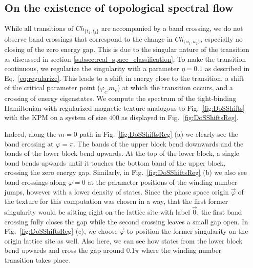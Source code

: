 \documentclass[submission, Phys]{SciPost}
\begin{document}
\subsection{On the existence of topological spectral flow}
While all transitions of $Ch_{\lbrace t_1, t_2 \rbrace }$ are accompanied by a band crossing, we do not observe band crossings that correspond to the change in $Ch_{\lbrace u_1, u_2 \rbrace }$, especially no closing of the zero energy gap. This is due to the singular nature of the transition as discussed in section \ref{subsec:real_space_classification}. To make the transition continuous, we regularize the singularity with a parameter $\eta=0.1$ as described in Eq.~\eqref{eq:regularize}. This leads to a shift in energy close to the transition, a shift of the critical parameter point ($\varphi_c$,$m_c$) at which the transition occurs, and a crossing of energy eigenstates.
We compute the spectrum of the tight-binding Hamiltonian with regularized magnetic texture analogous to Fig.~\ref{fig:DoSShifts} with the KPM on a system of size $400$ as displayed in Fig.~\ref{fig:DoSShiftsReg}.

Indeed, along the $m=0$ path in Fig.~\ref{fig:DoSShiftsReg} (a) we clearly see the band crossing at $\varphi=\pi$. The bands of the upper block bend downwards and the bands of the lower block bend upwards. At the top of the lower block, a single band bends upwards until it touches the bottom band of the upper block, crossing the zero energy gap.
Similarly, in Fig.~\ref{fig:DoSShiftsReg} (b) we also see band crossings along $\varphi=0$ at the parameter positions of the winding number jumps, however with a lower density of states. Since the phase space origin $\vec{\varphi}$ of the texture for this computation was chosen in a way, that the first former singularity would be sitting right on the lattice site with label $\vec{0}$, the first band crossing fully closes the gap while the second crossing leaves a small gap open.
In Fig.~\ref{fig:DoSShiftsReg} (c), we choose $\vec{\varphi}$ to position the former singularity on the origin lattice site as well. Also here, we can see how states from the lower block bend upwards and cross the gap around $0.1\pi$ where the winding number transition takes place.
\figureXIIa
\figureXIII
\end{document}
